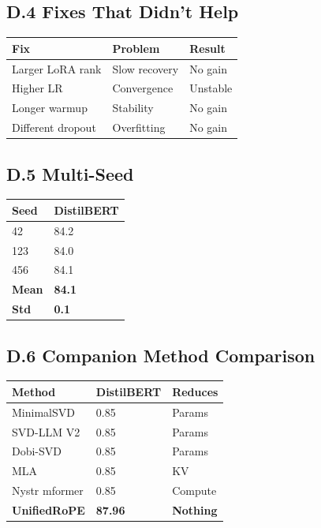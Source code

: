 \subsection{D.4 Fixes That Didn't Help}

\begin{table}[H]
\centering
\small
\begin{tabular}{lll}
\toprule
\textbf{Fix} & \textbf{Problem} & \textbf{Result} \\
\midrule
Larger LoRA rank & Slow recovery & No gain \\
Higher LR & Convergence & Unstable \\
Longer warmup & Stability & No gain \\
Different dropout & Overfitting & No gain \\
\bottomrule
\end{tabular}
\end{table}

\subsection{D.5 Multi-Seed}

\begin{table}[H]
\centering
\small
\begin{tabular}{ll}
\toprule
\textbf{Seed} & \textbf{DistilBERT} \\
\midrule
42 & 84.2 \\
123 & 84.0 \\
456 & 84.1 \\
\textbf{Mean} & \textbf{84.1} \\
\textbf{Std} & \textbf{0.1} \\
\bottomrule
\end{tabular}
\end{table}

\subsection{D.6 Companion Method Comparison}

\begin{table}[H]
\centering
\small
\begin{tabular}{lll}
\toprule
\textbf{Method} & \textbf{DistilBERT} & \textbf{Reduces} \\
\midrule
MinimalSVD & 0.85 & Params \\
SVD-LLM V2 & 0.85 & Params \\
Dobi-SVD & 0.85 & Params \\
MLA & 0.85 & KV \\
Nystr mformer & 0.85 & Compute \\
\textbf{UnifiedRoPE} & \textbf{87.96} & \textbf{Nothing} \\
\bottomrule
\end{tabular}
\end{table}

